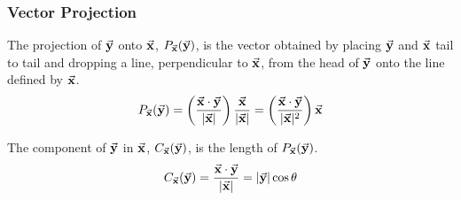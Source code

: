 \documentclass{beamer}
\begin{document}
\begin{frame}
  \frametitle{Vector Projection}

The projection of $\vec{\mathbf{y}}$ onto $\vec{\mathbf{x}}$, $P_{\vec{\mathbf{x}}}(\vec{\mathbf{y}})$, is the vector obtained by placing $\vec{\mathbf{y}}$ and $\vec{\mathbf{x}}$ tail to tail and dropping a line, perpendicular to $\vec{\mathbf{x}}$, from the head of $\vec{\mathbf{y}}$ onto the line defined by $\vec{\mathbf{x}}$.
\[
P_{\vec{\mathbf{x}}}(\vec{\mathbf{y}}) = \left(\frac{\vec{\mathbf{x}} \cdot \vec{\mathbf{y}}}{|\vec{\mathbf{x}}|}\right) \frac{\vec{\mathbf{x}}}{|\vec{\mathbf{x}}|} = \left(\frac{\vec{\mathbf{x}} \cdot \vec{\mathbf{y}}}{|\vec{\mathbf{x}}|^2}\right)\vec{\mathbf{x}}
\]

The component of $\vec{\mathbf{y}}$ in $\vec{\mathbf{x}}$, $C_{\vec{\mathbf{x}}}(\vec{\mathbf{y}})$, is the length of $P_{\vec{\mathbf{x}}}(\vec{\mathbf{y}})$.
\[
C_{\vec{\mathbf{x}}}(\vec{\mathbf{y}}) = \frac{\vec{\mathbf{x}} \cdot \vec{\mathbf{y}}}{|\vec{\mathbf{x}}|} = |\vec{\mathbf{y}}|\cos \theta
\]

\begin{center}



\end{center}


\end{frame}
\end{document}
